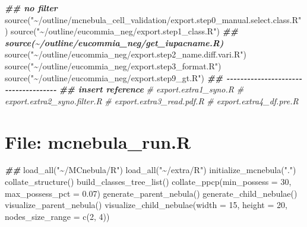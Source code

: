 \documentclass[
]{article}
\newenvironment{Shaded}{\begin{snugshade}}{\end{snugshade}}
\newcommand{\AttributeTok}[1]{\textcolor[rgb]{0.77,0.63,0.00}{#1}}
\newcommand{\CommentTok}[1]{\textcolor[rgb]{0.56,0.35,0.01}{\textit{#1}}}
\newcommand{\DecValTok}[1]{\textcolor[rgb]{0.00,0.00,0.81}{#1}}
\newcommand{\DocumentationTok}[1]{\textcolor[rgb]{0.56,0.35,0.01}{\textbf{\textit{#1}}}}
\newcommand{\FloatTok}[1]{\textcolor[rgb]{0.00,0.00,0.81}{#1}}
\newcommand{\FunctionTok}[1]{\textcolor[rgb]{0.00,0.00,0.00}{#1}}
\newcommand{\NormalTok}[1]{#1}
\newcommand{\StringTok}[1]{\textcolor[rgb]{0.31,0.60,0.02}{#1}}
\begin{document}
\begin{Shaded}
\begin{Highlighting}[]
\DocumentationTok{\#\# no filter}
\FunctionTok{source}\NormalTok{(}\StringTok{"\textasciitilde{}/outline/mcnebula\_cell\_validation/export.step0\_manual.select.class.R"}\NormalTok{)}
\FunctionTok{source}\NormalTok{(}\StringTok{"\textasciitilde{}/outline/eucommia\_neg/export.step1\_class.R"}\NormalTok{)}
\DocumentationTok{\#\# source(\textasciitilde{}/outline/eucommia\_neg/get\_iupacname.R)}
\FunctionTok{source}\NormalTok{(}\StringTok{"\textasciitilde{}/outline/eucommia\_neg/export.step2\_name.diff.vari.R"}\NormalTok{)}
\FunctionTok{source}\NormalTok{(}\StringTok{"\textasciitilde{}/outline/eucommia\_neg/export.step3\_format.R"}\NormalTok{)}
\FunctionTok{source}\NormalTok{(}\StringTok{"\textasciitilde{}/outline/eucommia\_neg/export.step9\_gt.R"}\NormalTok{)}
\DocumentationTok{\#\# {-}{-}{-}{-}{-}{-}{-}{-}{-}{-}{-}{-}{-}{-}{-}{-}{-}{-}{-}{-}{-}{-}{-}{-}{-}{-}{-}{-}{-}{-}{-}{-}{-}{-}{-}{-}{-} }
\DocumentationTok{\#\# insert reference}
\CommentTok{\# export.extra1\_syno.R}
\CommentTok{\# export.extra2\_syno.filter.R}
\CommentTok{\# export.extra3\_read.pdf.R}
\CommentTok{\# export.extra4\_df.pre.R}
\end{Highlighting}
\end{Shaded}

\hypertarget{file-mcnebula_run.r}{%
\section{File: mcnebula\_run.R}\label{file-mcnebula_run.r}}

\begin{Shaded}
\begin{Highlighting}[]
\DocumentationTok{\#\# }
\FunctionTok{load\_all}\NormalTok{(}\StringTok{"\textasciitilde{}/MCnebula/R"}\NormalTok{)}
\FunctionTok{load\_all}\NormalTok{(}\StringTok{"\textasciitilde{}/extra/R"}\NormalTok{)}
\FunctionTok{initialize\_mcnebula}\NormalTok{(}\StringTok{"."}\NormalTok{)}
\FunctionTok{collate\_structure}\NormalTok{()}
\FunctionTok{build\_classes\_tree\_list}\NormalTok{()}
\FunctionTok{collate\_ppcp}\NormalTok{(}\AttributeTok{min\_possess =} \DecValTok{30}\NormalTok{, }\AttributeTok{max\_possess\_pct =} \FloatTok{0.07}\NormalTok{)}
\FunctionTok{generate\_parent\_nebula}\NormalTok{()}
\FunctionTok{generate\_child\_nebulae}\NormalTok{()}
\FunctionTok{visualize\_parent\_nebula}\NormalTok{()}
\FunctionTok{visualize\_child\_nebulae}\NormalTok{(}\AttributeTok{width =} \DecValTok{15}\NormalTok{, }\AttributeTok{height =} \DecValTok{20}\NormalTok{, }\AttributeTok{nodes\_size\_range =} \FunctionTok{c}\NormalTok{(}\DecValTok{2}\NormalTok{, }\DecValTok{4}\NormalTok{))}
\end{Highlighting}
\end{Shaded}
\end{document}

